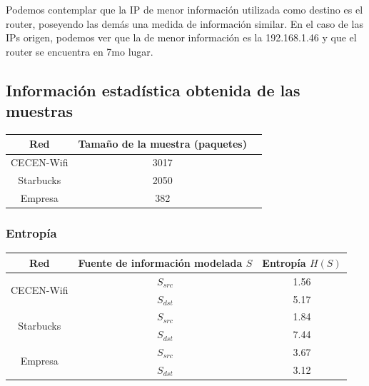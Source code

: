 \documentclass[10pt, a4paper]{article}
\begin{document}
Podemos contemplar que la IP de menor información utilizada como destino es el router, poseyendo las demás una medida de información similar. En el caso de las IPs origen, podemos ver que la de menor información es la 192.168.1.46 y que el router se encuentra en 7mo lugar. 

\subsection{Información estadística obtenida de las muestras}

\begin{center}
\begin{tabular}{|c|c|c|}
\hline
Red & Tamaño de la muestra (paquetes)\\
\hline
CECEN-Wifi & 3017 \\
Starbucks   & 2050 \\
Empresa    &  382 \\
\hline
\end{tabular}
\end{center}


\subsubsection{Entropía}

\begin{center}
\begin{tabular}{|c|c|c|}
\hline
Red & Fuente de información modelada $S$ & Entropía $H(S)$ \\ %
\hline
\multirow{2}{*}{CECEN-Wifi}  & $S_{src}$ & 1.56 \\ %
	                         & $S_{dst}$ & 5.17 \\ %
\hline
\multirow{2}{*}{Starbucks}   & $S_{src}$ & 1.84 \\ %
                             & $S_{dst}$ & 7.44 \\ %
\hline
\multirow{2}{*}{Empresa}     & $S_{src}$ & 3.67 \\ %
	                         & $S_{dst}$ & 3.12 \\ %
\hline
\end{tabular}
\end{center}
\end{document}
